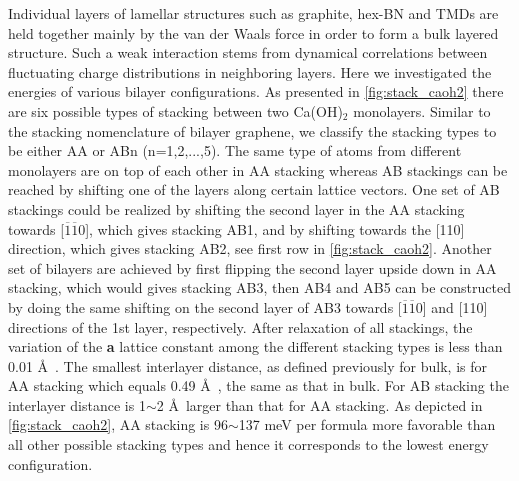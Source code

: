 Individual layers of lamellar structures such as graphite, hex-BN and TMDs 
are held together mainly by the van der Waals force in order to form a bulk 
layered structure. Such a weak interaction stems from dynamical correlations 
between 
fluctuating charge distributions in neighboring layers. Here we 
investigated the energies of various bilayer configurations. As presented
in \autoref{fig:stack_caoh2} there are six possible types of stacking between two 
Ca(OH)$_2$ monolayers. Similar to the stacking nomenclature of bilayer graphene, 
we classify the stacking types to be either AA or ABn (n=1,2,...,5). The 
same type of atoms from different monolayers are on top of each other in AA 
stacking whereas AB stackings can be reached by shifting one of the layers along 
certain lattice vectors. One set of AB stackings could be realized by shifting 
the second layer in the AA stacking towards [$\overline{1}\overline{1}0$], 
which gives stacking AB1, and by shifting towards the [110] direction, which 
gives stacking AB2, see first row in \autoref{fig:stack_caoh2}. Another set of 
bilayers are achieved by first flipping the second layer upside down in AA 
stacking, which
would gives stacking AB3, then AB4 and AB5 can be constructed by doing the 
same shifting on the second layer of AB3 towards [$\overline{1}\overline{1}0$] 
and [110] directions of the 1st layer, respectively. After relaxation of all 
stackings, the variation of the \textbf{a} lattice constant among the different 
stacking types is less than 0.01 \AA~. The smallest interlayer
distance, as defined previously for bulk, is for AA stacking which equals
0.49 \AA~, the same as that in bulk. For AB
stacking the interlayer distance is 1$\sim$2 \AA ~larger than that for AA
stacking. As depicted in \autoref{fig:stack_caoh2}, AA stacking is 96$\sim$137 meV
per formula more favorable than all other possible stacking types and hence it
corresponds to the lowest energy configuration. 

